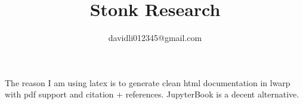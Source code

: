 \documentclass{book}
\title{Stonk Research}
\author{davidli012345@gmail.com}
\begin{document}
\maketitle                      %


 The reason I am using latex is to generate clean html documentation in lwarp with pdf support and citation + references. JupyterBook is a decent alternative.

\tableofcontents                %
\listoffigures




\begin{warpprint}   %
\cleardoublepage    %
{}
\end{warpprint}
\ForceHTMLPage      %
\ForceHTMLTOC       %
\printindex

\begin{warpprint}   %
\cleardoublepage    %
\end{warpprint}

\nocite{*}
\printbibliography

\end{document}
